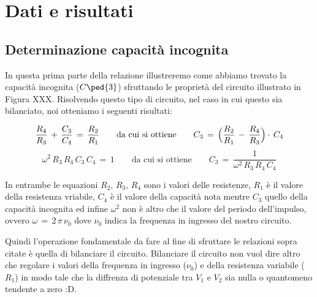 \section*{Dati e risultati}

\subsection*{Determinazione capacità incognita}

In questa prima parte della relazione illustreremo come abbiamo trovato la capacità incognita ($C\ped{3}$) sfruttando le proprietà del circuito illustrato in Figura XXX.
Risolvendo questo tipo di circuito, nel caso in cui questo sia bilanciato, noi otteniamo i seguenti risultati:

\begin{equation}
	\frac{R_4}{R_3} \,+\, \frac{C_3}{C_4} \,=\, \frac{R_2}{R_1} \qquad \text{da cui si ottiene} \qquad C_3 \,=\, \Bigl(\frac{R_2}{R_1} \,-\, \frac{R_4}{R_3}\Bigr)\cdot\,C_4
	\label{eq:C}
\end{equation}
\begin{equation}
	\omega^2\,R_3\,R_4\,C_3\,C_4 \,=\, 1 \qquad \text{da cui si ottiene} \qquad C_3 \,=\, \frac{1}{\omega^2\,R_3\,R_4\,C_4}
	\label{eq:C_imm}
\end{equation}
%

In entrambe le equazioni $R_2,\,R_3,\,R_4$ sono i valori delle resistenze, $R_1$ è il valore della resistenza vriabile, $C_4$ è il valore della capacità nota mentre $C_3$ quello della capacità incognita ed infine $\omega^2$ non è altro che il valore del periodo dell'impulso, ovvero $\omega \,=\, 2\,\pi\,\nu_0$ dove $\nu_0$ indica la frequenza in ingresso del nostro circuito.

Quindi l'operazione fondamentale da fare al fine di sfruttare le relazioni sopra citate è quella di bilanciare il circuito. Bilanciare il circuito non vuol dire altro che regolare i valori della frequenza in ingresso ($\nu_0$) e della resistenza variabile ($R_1$) in modo tale che la diffrenza di potenziale tra $V_1$ e $V_2$ sia nulla o quantomeno tendente a zero :D.